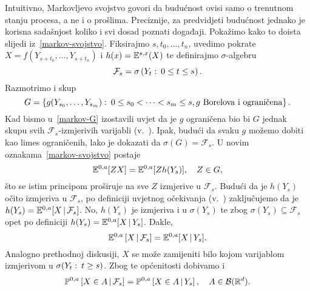 \documentclass[main.tex]{subfiles}
\begin{document}
\begin{komentar}
	Intuitivno, Markovljevo svojstvo govori da budućnost ovisi samo o trenutnom stanju procesa, a ne i o prošlima. Preciznije, za predvidjeti budućnost jednako je korisna
	sadašnjost koliko i svi dosad poznati događaji. Pokažimo kako to doista slijedi iz~\eqref{markov-svojstvo}. Fiksirajmo \( s, t_0, \ldots, t_n \), uvedimo
	pokrate \( X = f\left(Y_{s+t_0},\ldots,Y_{s+t_n}\right) \) i \( h(x) = \mathbb{E}^{s,x}(X)  \) te definirajmo \( \sigma \)-algebru
	\[
		\mathcal F_s = \sigma \left( Y_t \, \colon \, 0 \le t \le s \right).
	\]
	Razmotrimo i skup
	\begin{equation} \label{markov-G}
		G = \left\{ g(Y_{s_0},\ldots,Y_{s_m}) \, \colon \, 0 \le s_0 < \cdots < s_m \le s, g \mathrm{\ Borelova \ i \ ograni\check cena} \right\}.
	\end{equation}
	Kad bismo u~\eqref{markov-G} izostavili uvjet da je \( g \) ograničena bio bi \( G \) jednak skupu svih \( \mathcal F_s \)-izmjerivih varijabli (v.~\cite[tm.~8.6]{sarapa}).
	Ipak, budući da svaku \( g \) možemo dobiti kao limes ograničenih, lako je dokazati da \( \sigma(G) = \mathcal F_s \). U novim oznakama~\eqref{markov-svojstvo}
	postaje
	\begin{equation}
		\mathbb{E}^{0,a}[ZX] = \mathbb{E}^{0,a}[Zh(Y_s)], \quad Z \in G,
	\end{equation}
	što se istim principom proširuje na sve \( Z \) izmjerive u \( \mathcal F_s \). Budući da je \( h(Y_s) \) očito izmjeriva u \( \mathcal F_s \), po definiciji uvjetnog očekivanja
	(v.~\cite[str.~579]{sarapa}) zaključujemo da je \( h(Y_s) = \mathbb{E}^{0,a}[X \, \vert \, \mathcal F_s] \). No, \( h(Y_s) \) je izmjeriva i u \( \sigma(Y_s) \) te zbog
	\( \sigma(Y_s) \subseteq \mathcal F_s \) opet po definiciji \( h(Y_s) = \mathbb{E}^{0,a}[X \, \vert \, Y_s] \). Dakle,
	\begin{equation}
		\mathbb{E}^{0,a}\left[ X \, \vert \, \mathcal F_s \right] = \mathbb{E}^{0,a}[X \, \vert \, Y_s].
	\end{equation}
	Analogno prethodnoj diskusiji, \( X \) se može zamijeniti bilo kojom varijablom izmjerivom u \( \sigma(Y_t \, \colon \, t \ge s) \). Zbog te općenitosti dobivamo i
	\begin{equation}
		\mathbb{P}^{0,a}\left[ X \in A \, \vert \, \mathcal F_s \right] = \mathbb{P}^{0,a}\left[ X \in A \, \vert \, Y_s \right], \quad A \in \mathcal B(\mathbb{R}^d).
	\end{equation}
\end{komentar}
\end{document}
